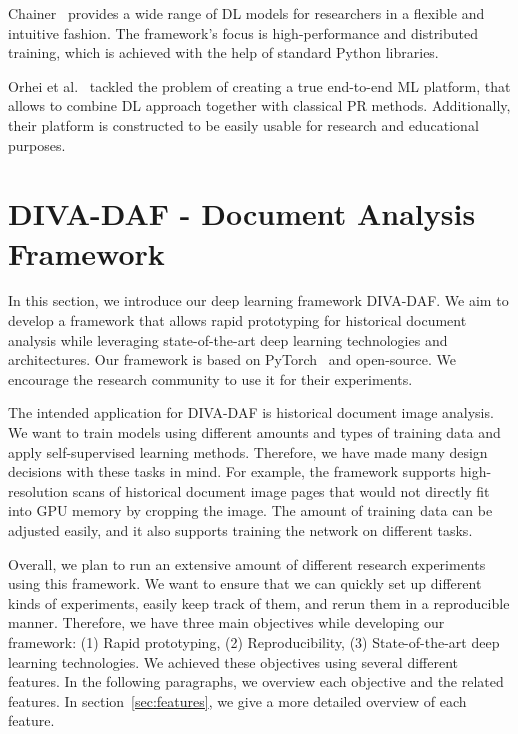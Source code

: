 \documentclass[runningheads]{llncs}
\begin{document}
Chainer~\cite{tokuiChainerDeepLearning2019} provides a wide range of \ac{DL} models for researchers in a flexible and intuitive fashion. 
The framework's focus is high-performance and distributed training, which is achieved with the help of standard Python libraries.

Orhei et al.~\cite{orheiEndToEndComputerVision2021} tackled the problem of creating a true end-to-end \ac{ML} platform, that allows to combine \ac{DL} approach together with classical \ac{PR} methods.
Additionally, their platform is constructed to be easily usable for research and educational purposes.

 
\section{DIVA-DAF - Document Analysis Framework}

In this section, we introduce our deep learning framework DIVA-DAF. We aim to develop a framework that allows rapid prototyping for historical document analysis while leveraging state-of-the-art deep learning technologies and architectures. Our framework is based on PyTorch~\cite{paszkePyTorchImperativeStyle2019} and open-source. We encourage the research community to use it for their experiments.

The intended application for DIVA-DAF is historical document image analysis. We want to train models using different amounts and types of training data and apply self-supervised learning methods. Therefore, we have made many design decisions with these tasks in mind. For example, the framework supports high-resolution scans of historical document image pages that would not directly fit into GPU memory by cropping the image.
The amount of training data can be adjusted easily, and it also supports training the network on different tasks. 

Overall, we plan to run an extensive amount of different research experiments using this framework. We want to ensure that we can quickly set up different kinds of experiments, easily keep track of them, and rerun them in a reproducible manner. Therefore, we have three main objectives while developing our framework: (1) Rapid prototyping, (2) Reproducibility, (3) State-of-the-art deep learning technologies. We achieved these objectives using several different features. In the following paragraphs, we overview each objective and the related features. In section~\ref{sec:features}, we give a more detailed overview of each feature.
\end{document}
